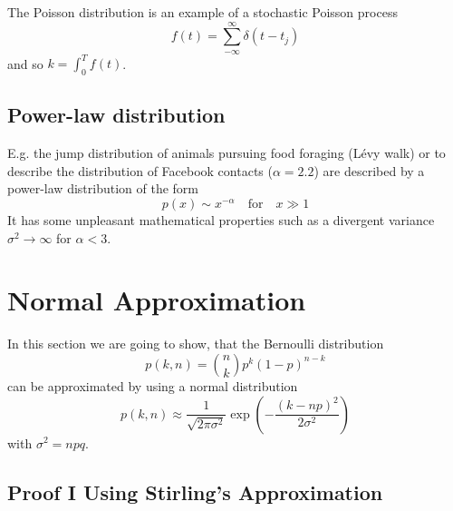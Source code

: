 \documentclass{/home/ben/Templates/notebook}
\begin{document}
	\begin{remark}
		The Poisson distribution is an example of a stochastic Poisson process 
		\begin{equation}
		f(t) = \sum^{\infty}_{-\infty}{\delta(t - t_j)}
		\end{equation}
		and so $k = \int^T_0{f(t)} $.	
	\end{remark}
	
	\subsection*{Power-law distribution}
	
	E.g. the jump distribution of animals pursuing food foraging (L\'evy walk) or to describe the distribution of Facebook contacts ($\alpha = 2.2$) are described by a power-law distribution of the form
	\begin{equation}
	p(x) \sim x^{- \alpha} \quad \mathrm{for} \quad x \gg 1
	\end{equation}
	It has some unpleasant mathematical properties such as a divergent variance $\sigma^2 \to \infty $ for $\alpha < 3$.
	
	
	\newpage
	\section{Normal Approximation}
	
	In this section we are going to show, that the Bernoulli distribution 
	\begin{equation}
	p(k,n) = \binom{n}{k} p^k (1 - p)^{n - k}
	\end{equation}
	can be approximated by using a normal distribution
	\begin{equation}
	p(k,n) \approx \frac{1}{\sqrt{2 \pi \sigma^2}} \exp(-\frac{(k-np)^2}{2 \sigma^2})
	\end{equation}
	with $\sigma^2 = npq$.
	
	\subsection*{Proof I Using Stirling's Approximation}
	
\end{document}
